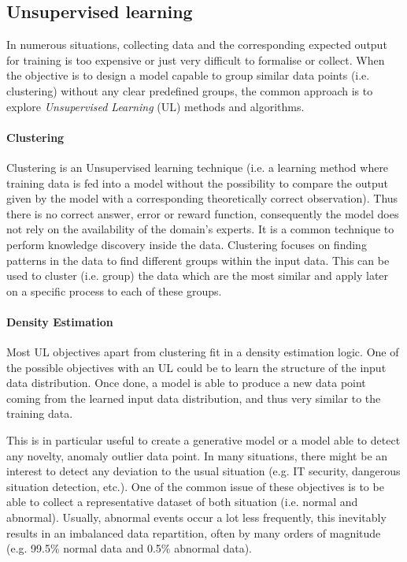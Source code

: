 \subsection{Unsupervised learning}

In numerous situations, collecting data and the corresponding expected output for training is too expensive or just very difficult to formalise or collect. When the objective is to design a model capable to group similar data points (i.e. clustering) without any clear predefined groups, the common approach is to explore \textit{Unsupervised Learning} (UL) methods and algorithms.

\paragraph{Clustering}

Clustering is an Unsupervised learning technique (i.e. a learning method where training data is fed into a model without the possibility to compare the output given by the model with a corresponding theoretically correct observation). Thus there is no correct answer, error or reward function, consequently the model does not rely on the availability of the domain’s experts. It is a common technique to perform knowledge discovery inside the data. Clustering focuses on finding patterns in the data to find different groups within the input data. This can be used to cluster (i.e. group) the data which are the most similar and apply later on a specific process to each of these groups.

\paragraph{Density Estimation}

Most UL objectives apart from clustering fit in a density estimation logic. One of the possible objectives with an UL could be to learn the structure of the input data distribution. Once done, a model is able to produce a new data point coming from the learned input data distribution, and thus very similar to the training data. 

This is in particular useful to create a generative model or a model able to detect any novelty, anomaly outlier data point. In many situations, there might be an interest to detect any deviation to the usual situation (e.g. IT security, dangerous situation detection, etc.). One of the common issue of these objectives is to be able to collect a representative dataset of both situation (i.e. normal and abnormal). Usually, abnormal events occur a lot less frequently, this inevitably results in an imbalanced data repartition, often by many orders of magnitude (e.g. 99.5\% normal data and 0.5\% abnormal data).


